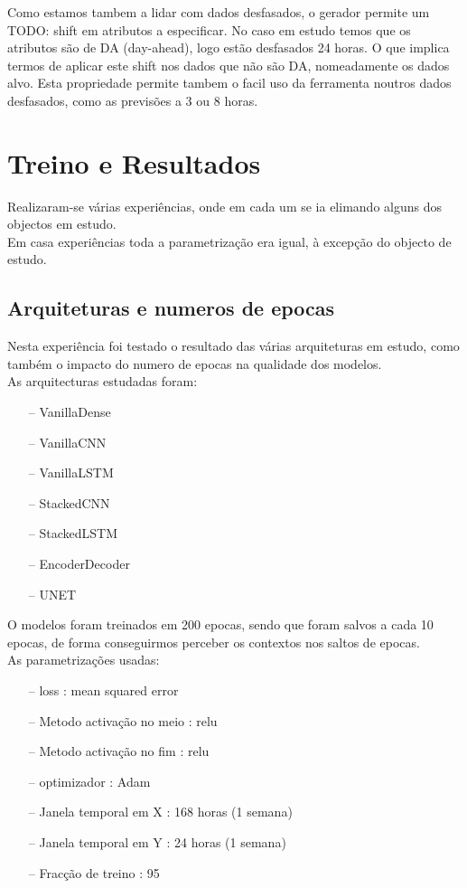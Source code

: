 Como estamos tambem a lidar com dados desfasados, o gerador permite um TODO: shift em atributos a especificar. No caso em estudo temos que os atributos são de DA (day-ahead), logo estão desfasados 24 horas. O que implica termos de aplicar este shift nos dados que não são DA, nomeadamente os dados alvo. Esta propriedade permite tambem o facil uso da ferramenta noutros dados desfasados, como as previsões a 3 ou 8 horas.\\


\section{Treino e Resultados  \label{se:training}}

Realizaram-se várias experiências, onde em cada um se ia elimando alguns dos objectos em estudo.\\
Em casa experiências toda a parametrização era igual, à excepção do objecto de estudo.\\

\subsection{Arquiteturas e numeros de epocas}

Nesta experiência foi testado o resultado das várias arquiteturas em estudo, como também o impacto do numero de epocas na qualidade dos modelos.\\
As arquitecturas estudadas foram:


\begin{itemize}
    \item[--] VanillaDense
    \item[--] VanillaCNN
    \item[--] VanillaLSTM
    \item[--] StackedCNN
    \item[--] StackedLSTM
    \item[--] EncoderDecoder
    \item[--] UNET
\end{itemize}

O modelos foram treinados em 200 epocas, sendo que foram salvos a cada 10 epocas, de forma conseguirmos perceber os contextos nos saltos de epocas.\\

As parametrizações usadas:
\begin{itemize}
    \item[--] loss : mean squared error
    \item[--] Metodo activação no meio : relu
    \item[--] Metodo activação no fim : relu
    \item[--] optimizador : Adam
    \item[--] Janela temporal em X : 168 horas (1 semana)
    \item[--] Janela temporal em Y : 24 horas (1 semana)
    \item[--] Fracção de treino : 95%
\end{itemize}

